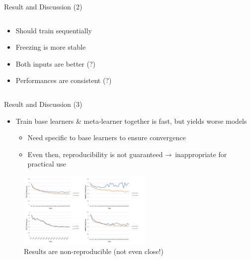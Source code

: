 \documentclass{cubeamer}
\begin{document}
\begin{frame}{Result and Discussion (2)}
    \begin{columns}
        \begin{column}{0.4\textwidth}
            \begin{itemize}
                \item Should train sequentially
                \item Freezing is more stable
                \item Both inputs are better (?)
                \item Performances are consistent (?)
            \end{itemize}
        \end{column}
        \begin{column}{0.6\textwidth}
            
        \end{column}
    \end{columns}
\end{frame}

\begin{frame}{Result and Discussion (3)}
    \begin{itemize}
        \item Train base learners \& meta-learner together is fast, but yields worse models
        \begin{itemize}
            \item Need  specific to base learners to ensure convergence
            \item Even then, reproducibility is not guaranteed $\rightarrow$ inappropriate for practical use
        \end{itemize}
    \end{itemize}
    \begin{figure}
        \centering
        \includegraphics[width=0.575\textwidth]{figures/irp_graph_non-reproducible.jpg}
        \caption{Results are non-reproducible (not even close!)}
    \end{figure}
\end{frame}
\end{document}
